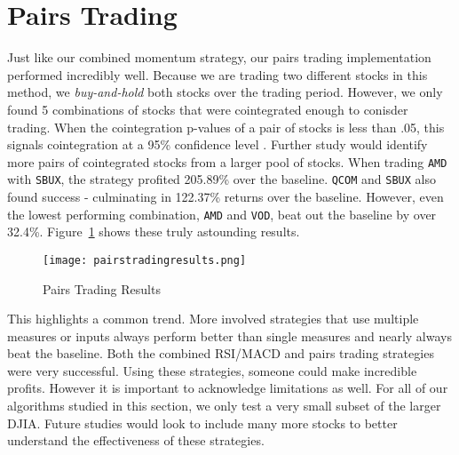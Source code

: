 \documentclass[../thesis.tex]{subfiles}
\begin{document}



\section{Pairs Trading}

Just like our combined momentum strategy, our pairs trading implementation performed incredibly well. Because we are trading two different stocks in this method, we \textit{buy-and-hold} both stocks over the trading period. However, we only found 5 combinations of stocks that were cointegrated enough to conisder trading. When the cointegration p-values of a pair of stocks is less than .05, this signals cointegration at a 95\% confidence level \cite{Gatev2006}. Further study would identify more pairs of cointegrated stocks from a larger pool of stocks. When trading \texttt{AMD} with \texttt{SBUX}, the strategy profited 205.89\% over the baseline. \texttt{QCOM} and \texttt{SBUX} also found success - culminating in 122.37\% returns over the baseline. However, even the lowest performing combination, \texttt{AMD} and \texttt{VOD}, beat out the baseline by over 32.4\%. Figure~\ref{PAIRSRESULTSfigure} shows these truly astounding results. 

\begin{figure}[h]
\centering
\texttt{[image: pairstradingresults.png]}
\caption{Pairs Trading Results \label{overflow}}
\label{PAIRSRESULTSfigure}
\end{figure}

This highlights a common trend. More involved strategies that use multiple measures or inputs always perform better than single measures and nearly always beat the baseline. Both the combined RSI/MACD and pairs trading strategies were very successful. Using these strategies, someone could make incredible profits. However it is important to acknowledge limitations as well. For all of our algorithms studied in this section, we only test a very small subset of the larger DJIA. Future studies would look to include many more stocks to better understand the effectiveness of these strategies. 
\end{document}
